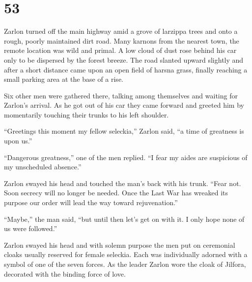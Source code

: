 
\chapter{53}

%

Zarlon turned off the main highway amid a grove of larzippa trees and onto a rough, poorly
maintained dirt road. Many karnons from the nearest town, the remote location was wild and
primal. A low cloud of dust rose behind his car only to be dispersed by the forest breeze. The
road slanted upward slightly and after a short distance came upon an open field of harsna grass,
finally reaching a small parking area at the base of a rise.

Six other men were gathered there, talking among themselves and waiting for Zarlon's arrival. As
he got out of his car they came forward and greeted him by momentarily touching their trunks to
his left shoulder.

``Greetings this moment my fellow seleckia,'' Zarlon said, ``a time of greatness is upon us.''

``Dangerous greatness,'' one of the men replied. ``I fear my aides are suspicious of my
unscheduled absence.''

Zarlon swayed his head and touched the man's back with his trunk. ``Fear not. Soon secrecy will
no longer be needed. Once the Last War has wreaked its purpose our order will lead the way
toward rejuvenation.''

``Maybe,'' the man said, ``but until then let's get on with it. I only hope none of us were
followed.''

Zarlon swayed his head and with solemn purpose the men put on ceremonial cloaks usually reserved
for female seleckia. Each was individually adorned with a symbol of one of the seven forces. As
the leader Zarlon wore the cloak of Jilfora, decorated with the binding force of love.


